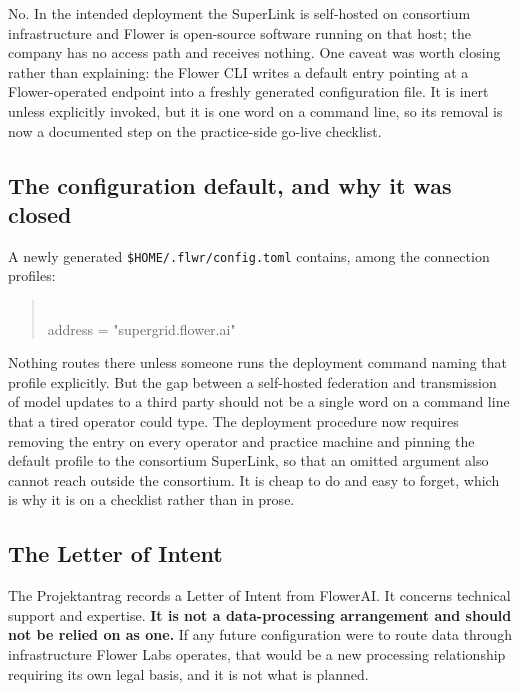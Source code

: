 \label{sec:flowerlabs}
\statusMethod

\begin{shortanswer}
No. In the intended deployment the SuperLink is self-hosted on consortium infrastructure and Flower
is open-source software running on that host; the company has no access path and receives nothing.
One caveat was worth closing rather than explaining: the Flower CLI writes a default entry pointing
at a Flower-operated endpoint into a freshly generated configuration file. It is inert unless
explicitly invoked, but it is one word on a command line, so its removal is now a documented step on
the practice-side go-live checklist.
\end{shortanswer}

\subsection{The configuration default, and why it was closed}

A newly generated \texttt{\$HOME/.flwr/config.toml} contains, among the connection profiles:

\begin{quote}\\
address = "supergrid.flower.ai"
\end{quote}

Nothing routes there unless someone runs the deployment command naming that profile explicitly. But
the gap between a self-hosted federation and transmission of model updates to a third party should
not be a single word on a command line that a tired operator could type. The deployment procedure now
requires removing the entry on every operator and practice machine and pinning the default profile to
the consortium SuperLink, so that an omitted argument also cannot reach outside the consortium. It is
cheap to do and easy to forget, which is why it is on a checklist rather than in prose.

\subsection{The Letter of Intent}

The Projektantrag \cite{projektantrag} records a Letter of Intent from FlowerAI. It concerns
technical support and expertise. \textbf{It is not a data-processing arrangement and should not be
relied on as one.} If any future configuration were to route data through infrastructure Flower Labs
operates, that would be a new processing relationship requiring its own legal basis, and it is not
what is planned.
